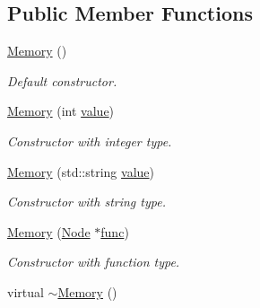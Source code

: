 \subsection*{Public Member Functions}
\begin{DoxyCompactItemize}
\item 
\hyperlink{classMemory_a585d7bb6fc6f2237bcebf94a86b7dd99}{Memory} ()
\begin{DoxyCompactList}\small\item\em Default constructor. \end{DoxyCompactList}\item 
\hyperlink{classMemory_a94bd3f09f65c210e6f4259724d2b8efa}{Memory} (int \hyperlink{classNode_a51de8a12e67206f893b0bd6c2afeb11c}{value})
\begin{DoxyCompactList}\small\item\em Constructor with integer type. \end{DoxyCompactList}\item 
\hyperlink{classMemory_a0174eface9607ffd7a5c40761ba09b1f}{Memory} (std\+::string \hyperlink{classNode_a51de8a12e67206f893b0bd6c2afeb11c}{value})
\begin{DoxyCompactList}\small\item\em Constructor with string type. \end{DoxyCompactList}\item 
\hyperlink{classMemory_a97531dd41f355d34c6479d9ebfd4b652}{Memory} (\hyperlink{classNode}{Node} $\ast$\hyperlink{classMemory_ae8c01f737989b477cf085612795ed13b}{func})
\begin{DoxyCompactList}\small\item\em Constructor with function type. \end{DoxyCompactList}\item 
\hypertarget{classMemory_a0ffa9759ebbf103f11132a505b93bdc0}{}virtual \hyperlink{classMemory_a0ffa9759ebbf103f11132a505b93bdc0}{$\sim$\+Memory} ()\label{classMemory_a0ffa9759ebbf103f11132a505b93bdc0}


\end{DoxyCompactItemize}
